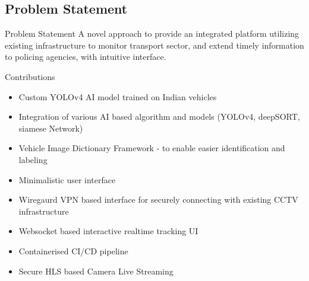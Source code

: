 \documentclass{beamer}
\begin{document}

	\subsection{Problem Statement}
	\begin{frame}{Problem Statement}
		A novel approach to provide an integrated platform utilizing existing infrastructure to monitor transport sector, and extend timely information to policing agencies, with intuitive interface.
	\end{frame}

	\begin{frame}{Contributions}
		\begin{itemize}
			\item Custom YOLOv4 AI model trained on Indian vehicles
			\item Integration of various AI based algorithm and models (YOLOv4, deepSORT, siamese Network)
   			\item Vehicle Image Dictionary Framework - to enable easier identification and labeling 
			\item Minimalistic user interface
			\item Wiregaurd VPN based interface for securely connecting with existing CCTV infrastructure
   			\item Websocket based interactive realtime tracking UI 
			\item Containerised CI/CD pipeline 
			\item Secure HLS based Camera Live Streaming
		\end{itemize}
	\end{frame}
\end{document}

